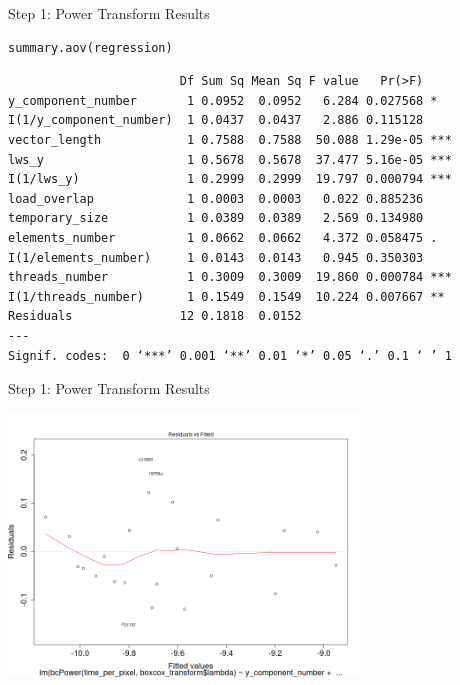 \documentclass[10pt, compress, aspectratio=169, xcolor={table,usenames,dvipsnames}]{beamer}
\begin{document}
\begin{frame}[fragile,label={sec:orga309dce}]{Step 1: Power Transform Results}
 \scriptsize
\lstset{language=r,label= ,caption= ,captionpos=b,numbers=none}
\begin{lstlisting}
summary.aov(regression)
\end{lstlisting}

\begin{verbatim}
                        Df Sum Sq Mean Sq F value   Pr(>F)
y_component_number       1 0.0952  0.0952   6.284 0.027568 *
I(1/y_component_number)  1 0.0437  0.0437   2.886 0.115128
vector_length            1 0.7588  0.7588  50.088 1.29e-05 ***
lws_y                    1 0.5678  0.5678  37.477 5.16e-05 ***
I(1/lws_y)               1 0.2999  0.2999  19.797 0.000794 ***
load_overlap             1 0.0003  0.0003   0.022 0.885236
temporary_size           1 0.0389  0.0389   2.569 0.134980
elements_number          1 0.0662  0.0662   4.372 0.058475 .
I(1/elements_number)     1 0.0143  0.0143   0.945 0.350303
threads_number           1 0.3009  0.3009  19.860 0.000784 ***
I(1/threads_number)      1 0.1549  0.1549  10.224 0.007667 **
Residuals               12 0.1818  0.0152
---
Signif. codes:  0 ‘***’ 0.001 ‘**’ 0.01 ‘*’ 0.05 ‘.’ 0.1 ‘ ’ 1
\end{verbatim}

\normalsize
\end{frame}
\begin{frame}[label={sec:org076ecc9}]{Step 1: Power Transform Results}
\begin{center}
\includegraphics[width=0.7\textwidth]{../img/regression_after_transform.png}
\end{center}
\end{frame}
\end{document}

